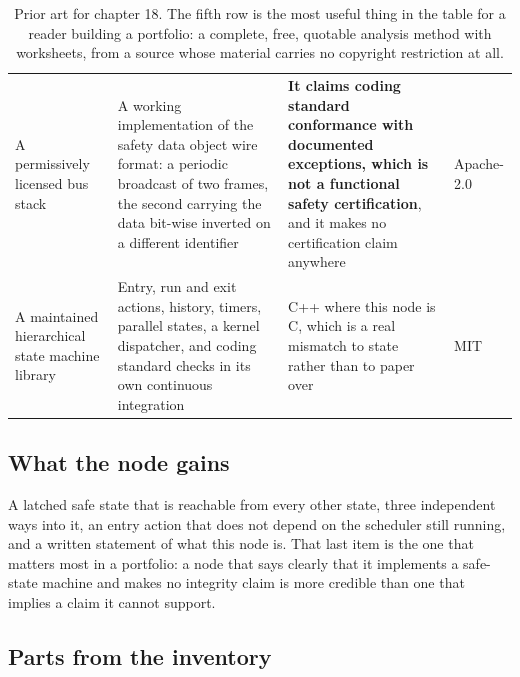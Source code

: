 \begin{table}[H]
\begin{tabular}{p{34mm}p{46mm}p{38mm}p{20mm}}
A permissively licensed bus stack & A working implementation of the safety
data object wire format: a periodic broadcast of two frames, the second carrying
the data bit-wise inverted on a different identifier & \textbf{It claims coding
standard conformance with documented exceptions, which is not a functional safety
certification}, and it makes no certification claim anywhere & Apache-2.0 \\
A maintained hierarchical state machine library & Entry, run and exit actions,
history, timers, parallel states, a kernel dispatcher, and coding standard checks
in its own continuous integration & C++ where this node is C, which is a real
mismatch to state rather than to paper over & MIT \\
\bottomrule
\end{tabular}
\caption{Prior art for chapter 18. The fifth row is the most useful thing in the table for a reader building a portfolio: a complete, free, quotable analysis method with worksheets, from a source whose material carries no copyright restriction at all.}
\end{table}

\subsection*{What the node gains}

A latched safe state that is reachable from every other state, three independent
ways into it, an entry action that does not depend on the scheduler still
running, and a written statement of what this node is. That last item is the one
that matters most in a portfolio: a node that says clearly that it implements a
safe-state machine and makes no integrity claim is more credible than one that
implies a claim it cannot support.

\subsection*{Parts from the inventory}


